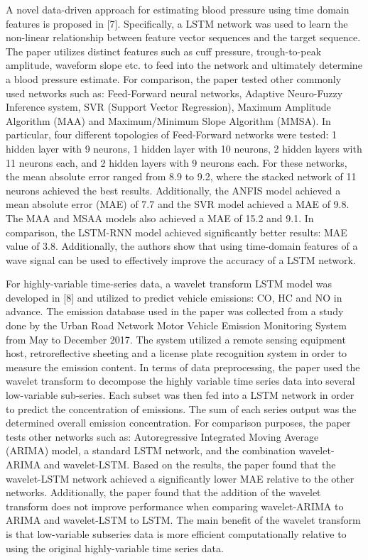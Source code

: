 \documentclass[journal]{IEEEtran}
\begin{document}
A novel data-driven approach for estimating blood pressure using time domain features is proposed in [7]. Specifically, a LSTM network was used to learn the non-linear relationship between feature vector sequences and the target sequence. The paper utilizes distinct features such as cuff pressure, trough-to-peak amplitude, waveform slope etc. to feed into the network and ultimately determine a blood pressure estimate. For comparison, the paper tested other commonly used networks such as: Feed-Forward neural networks, Adaptive Neuro-Fuzzy Inference system, SVR (Support Vector Regression), Maximum Amplitude Algorithm (MAA) and Maximum/Minimum Slope Algorithm (MMSA). In particular, four different topologies of Feed-Forward networks were tested: 1 hidden layer with 9 neurons, 1 hidden layer with 10 neurons, 2 hidden layers with 11 neurons each, and 2 hidden layers with 9 neurons each. For these networks, the mean absolute error ranged from 8.9 to 9.2, where the stacked network of 11 neurons achieved the best results. Additionally, the ANFIS model achieved a mean absolute error (MAE) of 7.7 and the SVR model achieved a MAE of 9.8. The MAA and MSAA models also achieved a MAE of 15.2 and 9.1. In comparison, the LSTM-RNN model achieved significantly better results: MAE value of 3.8. Additionally, the authors show that using time-domain features of a wave signal can be used to effectively improve the accuracy of a LSTM network. 

For highly-variable time-series data, a wavelet transform LSTM model was developed in [8] and utilized to predict vehicle emissions: CO, HC and NO in advance. The emission database used in the paper was collected from a study done by the Urban Road Network Motor Vehicle Emission Monitoring System from May to December 2017. The system utilized a remote sensing equipment host, retroreflective sheeting and a license plate recognition system in order to measure the emission content. In terms of data preprocessing, the paper used the wavelet transform to decompose the highly variable time series data into several low-variable sub-series. Each subset was then fed into a LSTM network in order to predict the concentration of emissions. The sum of each series output was the determined overall emission concentration. For comparison purposes, the paper tests other networks such as: Autoregressive Integrated Moving Average (ARIMA) model, a standard LSTM network, and the combination wavelet-ARIMA and wavelet-LSTM. Based on the results, the paper found that the wavelet-LSTM network achieved a significantly lower MAE relative to the other networks. Additionally, the paper found that the addition of the wavelet transform does not improve performance when comparing wavelet-ARIMA to ARIMA and wavelet-LSTM to LSTM. The main benefit of the wavelet transform is that low-variable subseries data is more efficient computationally relative to using the original highly-variable time series data. 
\end{document}
